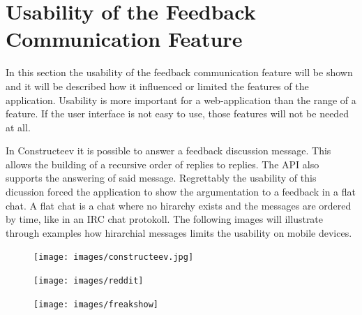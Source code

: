 \section{Usability of the Feedback Communication Feature}
In this section the usability of the feedback communication feature will be shown and it will be described how it influenced or limited the features of the application. Usability is more important for a web-application than the range of a feature. If the user interface is not easy to use, those features will not be needed at all.

In Constructeev it is possible to answer a feedback discussion message. This allows the building of a recursive order of replies to replies. The API also supports the answering of said message. Regrettably the usability of this dicussion forced the application to show the argumentation to a feedback in a flat chat. A flat chat is a chat where no hirarchy exists and the messages are ordered by time, like in an IRC chat protokoll.  \cite{RFC1459} The following images will illustrate through examples how hirarchial messages limits the usability on mobile devices.
\begin{figure}[h]
\centering
\begin{minipage}{.5\textwidth}
  \centering
  \texttt{[image: images/constructeev.jpg]}
  \label{fig:test1}
\end{minipage}%
\begin{minipage}{.5\textwidth}
  \centering
  \texttt{[image: images/reddit]}
  \label{fig:test2}
\end{minipage}
\centering
  \texttt{[image: images/freakshow]}
  \label{fig:test2}
\end{figure}

\newpage
